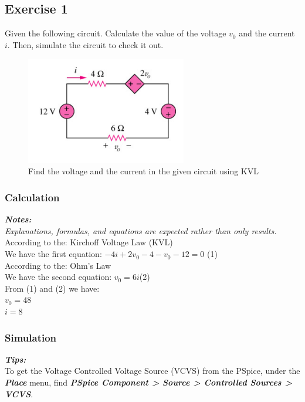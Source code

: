 \subsection{Exercise 1}
Given the following circuit. Calculate the value of the voltage $v_0$ and the current $i$. Then, simulate the circuit to check it out.

\begin{figure}[!htp]
    \centering
    \includegraphics[width = 7cm]{source/picture/bai_1/Bai1_de.png}
    \caption{Find the voltage and the current in the given circuit using KVL}
    \label{lab1_ex1_de}
\end{figure}

\subsubsection{Calculation}
\textit{\textbf{Notes:}}\\
\textit{Explanations, formulas, and equations are expected rather than only results.}\\

According to the:  Kirchoff Voltage Law (KVL)\bigskip\\
We have the first equation:  \dotfill $-4i+2v_0-4-v_0-12=0$ \dotfill\bigskip(1)\\
According to the:  Ohm's Law\bigskip\\
We have the second equation: \dotfill $v_0 = 6i$\dotfill\bigskip(2)\\
From (1) and (2) we have:\bigskip\\
$v_0 = 48$ \dotfill\bigskip\\
$i = 8$ \dotfill\bigskip\\

\subsubsection{Simulation}

\textbf{\textit{Tips:}}\\
To get the Voltage Controlled Voltage Source (VCVS) from the PSpice, under the \textit{\textbf{Place}} menu, find \textbf{\textit{PSpice Component > Source > Controlled Sources > VCVS}}.

